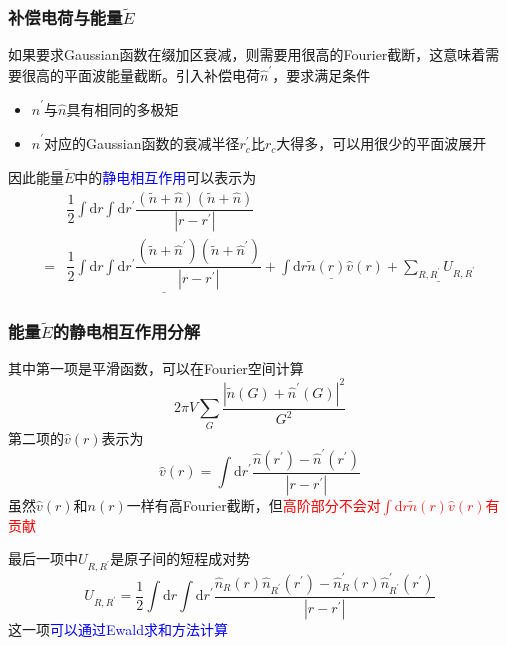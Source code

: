 \frame
{
	\frametitle{补偿电荷与能量$\tilde E$}
	如果要求\textrm{Gaussian}函数在缀加区衰减，则需要用很高的\textrm{Fourier}截断，这意味着需要很高的平面波能量截断。引入补偿电荷$\hat n^{\prime}$，要求满足条件
	\begin{itemize}
		\item $\hat n^{\prime}$与$\hat n$具有相同的多极矩
		\item $\hat n^{\prime}$对应的\textrm{Gaussian}函数的衰减半径$r_c^{\prime}$比$r_c$大得多，可以用很少的平面波展开
	\end{itemize}
	因此能量$\tilde E$中的\textcolor{blue}{静电相互作用}可以表示为
	\begin{displaymath}
		\begin{aligned}
			&\dfrac12\int\mathrm{d}r\int\mathrm{d}r^{\prime}\dfrac{(\tilde n+\hat n)(\tilde n+\hat n)}{|r-r^{\prime}|}\\
			=&\underline{\dfrac12\int\mathrm{d}r\int\mathrm{d}r^{\prime}\dfrac{(\tilde n+\hat n^{\prime})(\tilde n+\hat n^{\prime})}{|r-r^{\prime}|}}
			+\underline{\int\mathrm{d}r\tilde n(r)\hat v(r)}+\underline{\sum_{R,R^{\prime}}U_{R,R^{\prime}}}
		\end{aligned}
	\end{displaymath}
}

\frame
{
	\frametitle{能量$\tilde E$的静电相互作用分解}
	其中第一项是平滑函数，可以在\textrm{Fourier}空间计算
	$$2\pi V\sum_G\dfrac{|\tilde n(G)+\hat n^{\prime}(G)|^2}{G^2}$$
	第二项的$\hat v(r)$表示为
	$$\hat v(r)=\int\mathrm{d}r^{\prime}\dfrac{\hat n(r^{\prime})-\hat n^{\prime}(r^{\prime})}{|r-r^{\prime}|}$$
	虽然$\hat v(r)$和$n(r)$一样有高\textrm{Fourier}截断，但\textcolor{red}{高阶部分不会对$\int\mathrm{d}r\tilde n(r)\hat v(r)$有贡献}

	最后一项中$U_{R,R^{\prime}}$是原子间的短程成对势
	$$U_{R,R^{\prime}}=\dfrac12\int\mathrm{d}r\int\mathrm{d}r^{\prime}\dfrac{\hat n_R(r)\hat n_{R^{\prime}}(r^{\prime})-\hat n_R^{\prime}(r)\hat n_{R^{\prime}}^{\prime}(r^{\prime})}{|r-r^{\prime}|}$$
	这一项\textcolor{blue}{可以通过\textrm{Ewald}求和方法计算}
}

